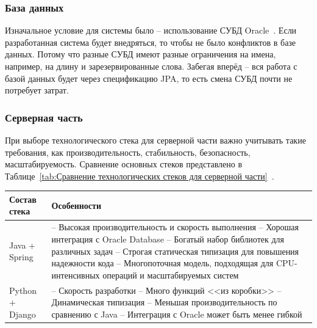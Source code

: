 \documentclass[a4paper,article]{article}
\begin{document}
\begin{sloppypar}
    \subsubsection{База данных}\label{Реализация. Выбор. База данных}

    Изначальное условие для системы было -- использование СУБД Oracle~\cite{oracle}. Если разработанная система будет внедряться, то чтобы не было конфликтов в базе данных. Потому что разные СУБД имеют разные ограничения на имена, например, на длину и зарезервированные слова. Забегая вперёд -- вся работа с базой данных будет через спецификацию JPA, то есть смена СУБД почти не потребует затрат.

    \newpage

    \subsubsection{Серверная часть}\label{Реализация. Выбор. Серверная часть}

    При выборе технологического стека для серверной части важно учитывать такие требования, как производительность, стабильность, безопасность, масштабируемость. Сравнение основных стеков представлено в Таблице~\ref{tab:Сравнение технологических стеков для серверной части}~\cite{backstack}.

    \begin{xltabular}{\textwidth} { |
        >{\hsize} X |
        >{\hsize} X | }

        \hline
        Состав стека
        & Особенности \\

        \hline
        Java + Spring
        & -- Высокая производительность и скорость выполнения \newline -- Хорошая интеграция с Oracle Database \newline -- Богатый набор библиотек для различных задач \newline -- Строгая статическая типизация для повышения надежности кода \newline -- Многопоточная модель, подходящая для CPU-интенсивных операций и масштабируемых систем \\

        \hline
        Python + Django
        & -- Скорость разработки \newline -- Много функций <<из коробки>> \newline -- Динамическая типизация \newline -- Меньшая производительность по сравнению с Java \newline -- Интеграция с Oracle может быть менее гибкой \\


\end{xltabular}
\end{sloppypar}
\end{document}
